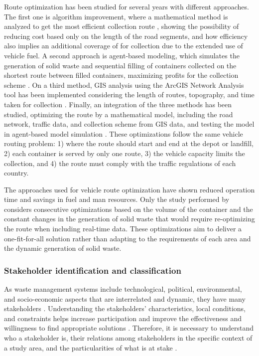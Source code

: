 \documentclass[authoryear,preprint,review,12pt]{elsarticle}
\begin{document}
    Route optimization has been studied for several years with different approaches. The first one is algorithm improvement, where a mathematical method is analyzed to get the most efficient collection route \citep{erdincRouteOptimizationElectric2019, Hannan2018, Sahib2021}, showing the possibility of reducing cost based only on the length of the road segments, and how efficiency also implies an additional coverage of for collection due to the extended use of vehicle fuel. A second approach is agent-based modeling, which simulates the generation of solid waste and sequential filling of containers collected on the shortest route between filled containers, maximizing profits for the collection scheme \citep{Likotiko2017}. On a third method, GIS analysis using the ArcGIS Network Analysis tool has been implemented considering the length of routes, topography, and time taken for collection \citep{Hemidat2017, Jovicic2010, Malakahmad2014}. Finally, an integration of the three methods has been studied, optimizing the route by a mathematical model, including the road network, traffic data, and collection scheme from GIS data, and testing the model in agent-based model simulation \citep{nguyen-trongOptimizationMunicipalSolid2017}. These optimizations follow the same vehicle routing problem: 1) where the route should start and end at the depot or landfill, 2) each container is served by only one route, 3) the vehicle capacity limits the collection, and 4) the route must comply with the traffic regulations of each country.

    The approaches used for vehicle route optimization have shown reduced operation time and savings in fuel and man resources. Only the study performed by \citet{Likotiko2017} considers consecutive optimizations based on the volume of the container and the constant changes in the generation of solid waste that would require re-optimizing the route when including real-time data. These optimizations aim to deliver a one-fit-for-all solution rather than adapting to the requirements of each area and the dynamic generation of solid waste.

    \subsubsection{Stakeholder identification and classification}
    \label{subsubsec:stakeholders}
    As waste management systems include technological, political, environmental, and socio-economic aspects that are interrelated and dynamic, they have many stakeholders \citep{Zaman2011}. Understanding the stakeholders’ characteristics, local conditions, and constraints helps increase participation and improve the effectiveness and willingness to find appropriate solutions \citep{Lishan2021, palacios-agundezIntegratingStakeholdersDemands2014}. Therefore, it is necessary to understand who a stakeholder is, their relations among stakeholders in the specific context of a study area, and the particularities of what is at stake \citep{Freeman2010}.
\end{document}
